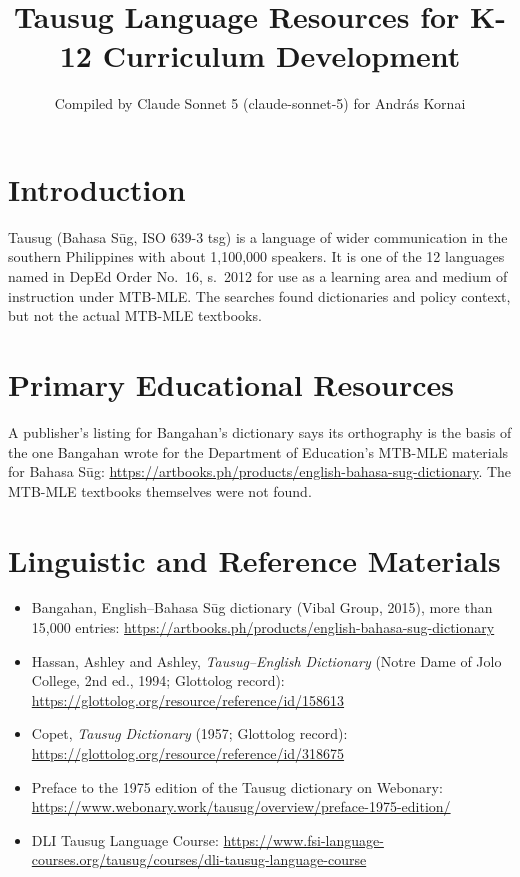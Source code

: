 \documentclass[12pt]{article}
\title{Tausug Language Resources for K-12 Curriculum Development}
\author{Compiled by Claude Sonnet 5 (claude-sonnet-5) for Andr\'as Kornai}
\date{}
\begin{document}
\maketitle

\section{Introduction}
Tausug (Bahasa S\=ug, ISO 639-3 tsg) is a language of wider communication in the southern Philippines with about 1,100,000 speakers. It is one of the 12 languages named in DepEd Order No.\ 16, s.\ 2012 for use as a learning area and medium of instruction under MTB-MLE. The searches found dictionaries and policy context, but not the actual MTB-MLE textbooks.

\section{Primary Educational Resources}
A publisher's listing for Bangahan's dictionary says its orthography is the basis of the one Bangahan wrote for the Department of Education's MTB-MLE materials for Bahasa S\=ug: \url{https://artbooks.ph/products/english-bahasa-sug-dictionary}. The MTB-MLE textbooks themselves were not found.

\section{Linguistic and Reference Materials}
\begin{itemize}
\item Bangahan, English--Bahasa S\=ug dictionary (Vibal Group, 2015), more than 15,000 entries: \url{https://artbooks.ph/products/english-bahasa-sug-dictionary}
\item Hassan, Ashley and Ashley, \emph{Tausug--English Dictionary} (Notre Dame of Jolo College, 2nd ed., 1994; Glottolog record): \url{https://glottolog.org/resource/reference/id/158613}
\item Copet, \emph{Tausug Dictionary} (1957; Glottolog record): \url{https://glottolog.org/resource/reference/id/318675}
\item Preface to the 1975 edition of the Tausug dictionary on Webonary: \url{https://www.webonary.work/tausug/overview/preface-1975-edition/}
\item DLI Tausug Language Course: \url{https://www.fsi-language-courses.org/tausug/courses/dli-tausug-language-course}
\end{itemize}
\end{document}

